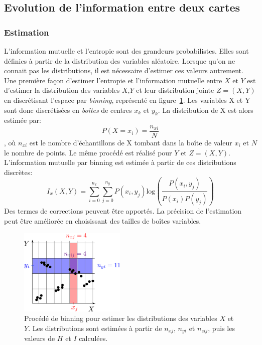 
\subsection{Evolution de l'information entre deux cartes}

\subsubsection{Estimation}
L'information mutuelle et l'entropie sont des grandeurs probabilistes. Elles sont définies à partir de la distribution des variables aléatoire. Lorsque qu'on ne connait pas les distributions, il est nécessaire d'estimer ces valeurs autrement. 
Une première façon d'estimer l'entropie et l'information mutuelle entre $X$ et $Y$ est d'estimer la distribution des variables $X$,$Y$ et leur distribution jointe $Z = (X,Y)$ en discrétisant l'espace par \emph{binning}, représenté en figure~\ref{fig:binning}. Les variables X et Y sont donc discrétisées en \emph{boîtes} de centres $x_k$ et $y_k$. La distribution de X est alors estimée par: 
$$P(X = x_i) = \frac{n_{xi}}{N} $$, où $n_{xi}$ est le nombre d'échantillons de X tombant dans la boîte de valeur $x_i$ et $N$ le nombre de points. Le même procédé est réalisé pour $Y$ et $Z = (X,Y)$.
L'information mutuelle par binning est estimée à partir de ces distributions discrètes:
\begin{equation}
    I_x(X,Y) = \sum_{i = 0}^{n_x} \sum_{j=0}^{n_y} {P(x_i,y_j)\textrm{log}\left(\frac{P(x_i,y_j)}{P(x_i)P(y_j)}\right)}
   \end{equation}
Des termes de corrections peuvent être apportés. La précision de l'estimation peut être améliorée en choisissant des tailles de boîtes variables. 
\begin{figure}
\centering
\includegraphics[width=0.45\textwidth]{boxes}
\caption{Procédé de binning pour estimer les distributions des variables $X$ et $Y$. Les distributions sont estimées à partir de $n_{xj}$, $n_{yi}$ et $n_{zij}$, puis les valeurs de $H$ et $I$ calculées.}
\label{fig:binning} 

\end{figure}

